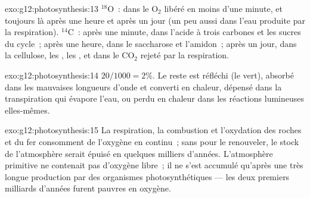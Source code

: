 \begin{solution}{exo:g12:photosynthesis:13}
$^{18}$O~: dans le $\mathrm{O_2}$ libéré en moins d'une minute, et
toujours là après une heure et après un jour (un peu aussi dans l'eau
produite par la respiration). $^{14}$C~: après une minute, dans
l'acide à trois carbones et les sucres du cycle~; après une heure,
dans le saccharose et l'amidon~; après un jour, dans la cellulose, les
, les , et dans le $\mathrm{CO_2}$ rejeté par la
respiration.
\end{solution}

\begin{solution}{exo:g12:photosynthesis:14}
$20/1000 = 2\%$. Le reste est réfléchi (le vert), absorbé dans les
mauvaises longueurs d'onde et converti en chaleur, dépensé dans la
transpiration qui évapore l'eau, ou perdu en chaleur dans les
réactions lumineuses elles-mêmes.
\end{solution}

\begin{solution}{exo:g12:photosynthesis:15}
La respiration, la combustion et l'oxydation des roches et du fer
consomment de l'oxygène en continu~; sans  pour le
renouveler, le stock de l'atmosphère serait épuisé en quelques
milliers d'années. L'atmosphère primitive ne contenait pas d'oxygène
libre~; il ne s'est accumulé qu'après une très longue production par
des organismes photosynthétiques --- les deux premiers milliards
d'années furent pauvres en oxygène.
\end{solution}

